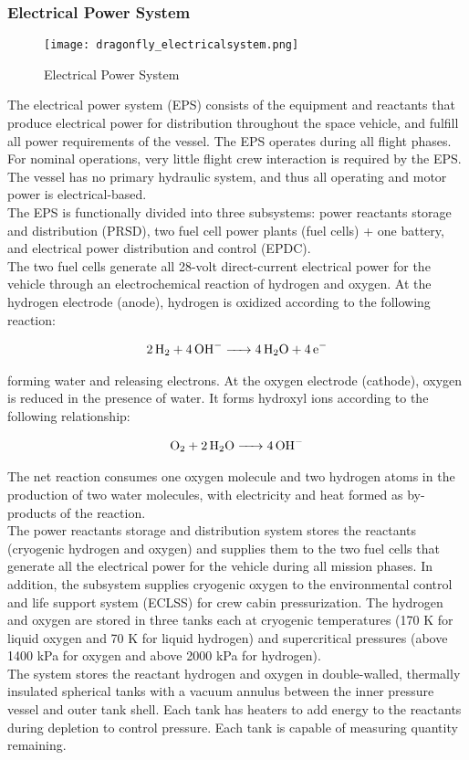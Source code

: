 \documentclass[Orbiter User Manual.tex]{subfiles}
\begin{document}
\subsubsection{Electrical Power System}

\begin{figure}[H]
  \centering
  \texttt{[image: dragonfly\_electricalsystem.png]}
  \caption{Electrical Power System}
\end{figure}

\noindent
The electrical power system (EPS) consists of the equipment and reactants that produce electrical power for distribution throughout the space vehicle, and fulfill all power requirements of the vessel. The EPS operates during all flight phases. For nominal operations, very little flight crew interaction is required by the EPS. The vessel has no primary hydraulic system, and thus all operating and motor power is electrical-based.\\
The EPS is functionally divided into three subsystems: power reactants storage and distribution (PRSD), two fuel cell power plants (fuel cells) + one battery, and electrical power distribution and control (EPDC).\\
The two fuel cells generate all 28-volt direct-current electrical power for the vehicle through an electrochemical reaction of hydrogen and oxygen. At the hydrogen electrode (anode), hydrogen is oxidized according to the following reaction:

\begin{align*}
\ce{2H_{2} + 4OH^{-} -> 4H_{2}O + 4e^{-}}
\end{align*}

\noindent
forming water and releasing electrons. At the oxygen electrode (cathode), oxygen is reduced in the presence of water. It forms hydroxyl ions according to the following relationship:

\begin{align*}
\ce{O_{2} + 2H_{2}O -> 4OH^{-}}
\end{align*}

\noindent
The net reaction consumes one oxygen molecule and two hydrogen atoms in the production of two water molecules, with electricity and heat formed as by-products of the reaction.\\
The power reactants storage and distribution system stores the reactants (cryogenic hydrogen and oxygen) and supplies them to the two fuel cells that generate all the electrical power for the vehicle during all mission phases. In addition, the subsystem supplies cryogenic oxygen to the environmental control and life support system (ECLSS) for crew cabin pressurization. The hydrogen and oxygen are stored in three tanks each at cryogenic temperatures (170 K for liquid oxygen and 70 K for liquid hydrogen) and supercritical pressures (above 1400 kPa for oxygen and above 2000 kPa for hydrogen).\\
The system stores the reactant hydrogen and oxygen in double-walled, thermally insulated spherical tanks with a vacuum annulus between the inner pressure vessel and outer tank shell. Each tank has heaters to add energy to the reactants during depletion to control pressure. Each tank is capable of measuring quantity remaining.
\end{document}
